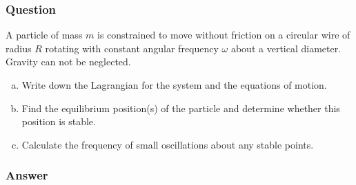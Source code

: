 \subsubsection{Question}

A particle of mass $m$ is constrained to move without friction on a circular
wire of radius $R$ rotating with constant angular frequency $ω$ about a
vertical diameter. Gravity can not be neglected.
\begin{enumerate}[a)]
    \item
        Write down the Lagrangian for the system and the equations of motion.
    \item
        Find the equilibrium position(s) of the particle and determine
        whether this position is stable.
    \item
        Calculate the frequency of small oscillations about any stable points.
\end{enumerate}

\begin{figure}[H]
    \centering
\end{figure}

\subsubsection{Answer}

